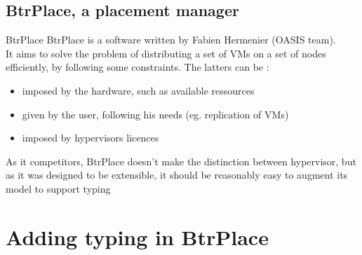 \documentclass{beamer}
\begin{document}
\subsection{BtrPlace, a placement manager}
\begin{frame}{BtrPlace}
BtrPlace is a software written  by Fabien Hermenier (OASIS team).\\
\pause It aims to solve the problem of distributing a set of VMs on
a set of nodes efficiently, by following some constraints. The latters
can be :
\begin{itemize}
	\item imposed by the hardware, such as available ressources
	\item given by the user, following his needs (eg. replication
		of VMs)
	\item imposed by hypervisors licences
\end{itemize}
\pause As it competitors, BtrPlace doesn't make the distinction
between hypervisor, but as it was designed to be extensible, it should
be reasonably easy to augment its model to support typing
\end{frame}
\section{Adding typing in BtrPlace}
\end{document}

